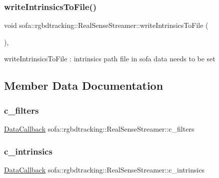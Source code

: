 \subsubsection{\texorpdfstring{write\+Intrinsics\+To\+File()}{writeIntrinsicsToFile()}}
{\footnotesize\ttfamily void sofa\+::rgbdtracking\+::\+Real\+Sense\+Streamer\+::write\+Intrinsics\+To\+File (\begin{DoxyParamCaption}{ }\end{DoxyParamCaption})\hspace{0.3cm}{\ttfamily [inline]}, {\ttfamily [protected]}}



write\+Intrinsics\+To\+File \+: intrinsics path file in sofa data needs to be set 



\subsection{Member Data Documentation}
\mbox{\label{classsofa_1_1rgbdtracking_1_1_real_sense_streamer_a4bad91d75e9017a902dd2486026c6ed2}} 
\subsubsection{\texorpdfstring{c\+\_\+filters}{c\_filters}}
{\footnotesize\ttfamily \hyperlink{namespacesofa_1_1rgbdtracking_a00834a9204a667746fef9a402ccbfb55}{Data\+Callback} sofa\+::rgbdtracking\+::\+Real\+Sense\+Streamer\+::c\+\_\+filters}

\mbox{\label{classsofa_1_1rgbdtracking_1_1_real_sense_streamer_a22b457cc55e1b6c1b0ce649c27c20ee6}} 
\subsubsection{\texorpdfstring{c\+\_\+intrinsics}{c\_intrinsics}}
{\footnotesize\ttfamily \hyperlink{namespacesofa_1_1rgbdtracking_a00834a9204a667746fef9a402ccbfb55}{Data\+Callback} sofa\+::rgbdtracking\+::\+Real\+Sense\+Streamer\+::c\+\_\+intrinsics}


